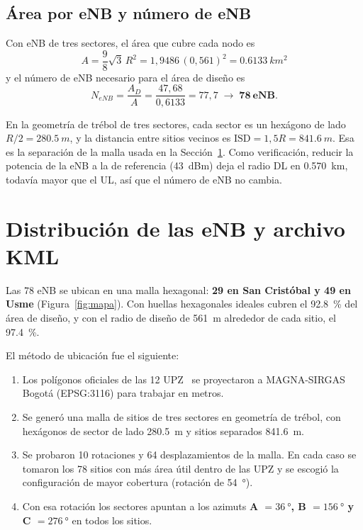\documentclass[11pt,letterpaper]{article}
\begin{document}
\subsection{Área por eNB y número de eNB}

Con eNB de tres sectores, el área que cubre cada nodo es
\begin{equation}
A = \frac{9}{8}\sqrt{3}\,R^2 = 1{,}9486\,(0{,}561)^2 = \SI{0.6133}{km^2}
\end{equation}
y el número de eNB necesario para el área de diseño es
\begin{equation}
N_{eNB} = \frac{A_D}{A} = \frac{47{,}68}{0{,}6133} = 77{,}7 \;\rightarrow\; \mathbf{78\ eNB}.
\end{equation}

En la geometría de trébol de tres sectores, cada sector es un hexágono de lado $R/2=\SI{280.5}{m}$, y la distancia entre sitios vecinos es $\mathrm{ISD}=1{,}5R=\SI{841.6}{m}$. Esa es la separación de la malla usada en la Sección~\ref{sec:distrib}. Como verificación, reducir la potencia de la eNB a la de referencia (\SI{43}{dBm}) deja el radio DL en \SI{0.570}{km}, todavía mayor que el UL, así que el número de eNB no cambia.

\section{Distribución de las eNB y archivo KML}
\label{sec:distrib}

Las 78 eNB se ubican en una malla hexagonal: \textbf{29 en San Cristóbal y 49 en Usme} (Figura~\ref{fig:mapa}). Con huellas hexagonales ideales cubren el \SI{92.8}{\percent} del área de diseño, y con el radio de diseño de \SI{561}{m} alrededor de cada sitio, el \SI{97.4}{\percent}.

El método de ubicación fue el siguiente:
\begin{enumerate}
  \item Los polígonos oficiales de las 12 UPZ~\cite{upz} se proyectaron a MAGNA-SIRGAS Bogotá (EPSG:3116) para trabajar en metros.
  \item Se generó una malla de sitios de tres sectores en geometría de trébol, con hexágonos de sector de lado \SI{280.5}{m} y sitios separados \SI{841.6}{m}.
  \item Se probaron 10 rotaciones y 64 desplazamientos de la malla. En cada caso se tomaron los 78 sitios con más área útil dentro de las UPZ y se escogió la configuración de mayor cobertura (rotación de \SI{54}{\degree}).
  \item Con esa rotación los sectores apuntan a los azimuts \textbf{A $=\SI{36}{\degree}$, B $=\SI{156}{\degree}$ y C $=\SI{276}{\degree}$} en todos los sitios.
\end{enumerate}
\end{document}
